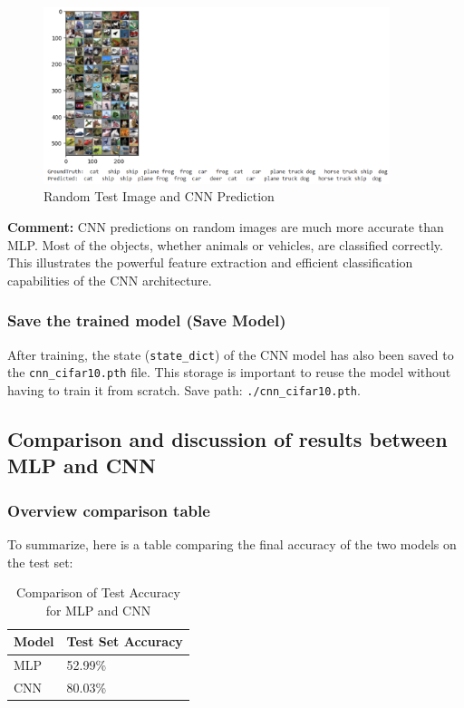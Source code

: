 \documentclass[12pt]{article}
\begin{document}
\begin{figure}[H]
    \centering
    \includegraphics[width=0.9\textwidth]{Screenshots/Ảnh chụp màn hình 2025-05-23 223812.png} %
    \caption{Random Test Image and CNN Prediction}
    \label{fig:cnn_random_predictions}
\end{figure}
\textbf{Comment:} CNN predictions on random images are much more accurate than MLP. Most of the objects, whether animals or vehicles, are classified correctly. This illustrates the powerful feature extraction and efficient classification capabilities of the CNN architecture.

\subsubsection{Save the trained model (Save Model)}
After training, the state (\texttt{state\_dict}) of the CNN model has also been saved to the \texttt{cnn\_cifar10.pth} file. This storage is important to reuse the model without having to train it from scratch. Save path: \texttt{./cnn\_cifar10.pth}.

\subsection{Comparison and discussion of results between MLP and CNN}
\subsubsection{Overview comparison table}
To summarize, here is a table comparing the final accuracy of the two models on the test set:

\begin{longtable}{|p{}|p{}|}
\caption{Comparison of Test Accuracy for MLP and CNN}
\label{tab:comparison_accuracy} \\
\toprule
\textbf{Model} & \textbf{Test Set Accuracy} \\
\midrule
MLP & 52.99\% \\
CNN & 80.03\% \\
\bottomrule
\end{longtable}
\end{document}
